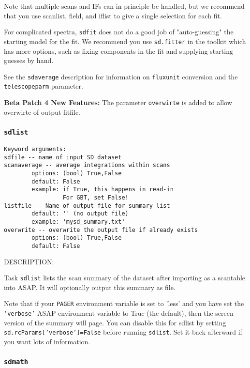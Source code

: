     Note that multiple scans and IFs can in principle be handled, but
    we recommend that you use scanlist, field, and iflist to give a
    single selection for each fit.

    For complicated spectra, {\tt sdfit} does not do a good job of
    "auto-guessing" the starting model for the fit.  We recommend
    you use {\tt sd.fitter} in the toolkit which has more options, such
    as fixing components in the fit and supplying starting guesses
    by hand.

    See the {\tt sdaverage} description for information on {\tt fluxunit} 
    conversion and the {\tt telescopeparm} parameter.

    {\bf Beta Patch 4 New Features:}
    The parameter {\tt overwirte} is added to allow overwirte of output fitfile.

\subsubsection{{\tt sdlist}}
\label{section:sd.sdtasks.tasks.sdlist}

\begin{verbatim}
Keyword arguments:
sdfile -- name of input SD dataset
scanaverage -- average integrations within scans
        options: (bool) True,False
        default: False
        example: if True, this happens in read-in
                 For GBT, set False!
listfile -- Name of output file for summary list
        default: '' (no output file)
        example: 'mysd_summary.txt'
overwrite -- overwrite the output file if already exists
        options: (bool) True,False
        default: False
\end{verbatim}
    
    DESCRIPTION:
    
    Task {\tt sdlist} lists the scan summary of the dataset after importing
    as a scantable into ASAP.  It will optionally output this summary
    as file.
    
    Note that if your {\tt PAGER} environment variable is set to 'less' and
    you have set the {\tt 'verbose'} ASAP environment variable to True
    (the default), then the screen version of the summary will page.
    You can disable this for sdlist by setting
         {\tt sd.rcParams['verbose']=False}
    before running {\tt sdlist}.  Set it back afterward if you want lots
    of information.

\subsubsection{{\tt sdmath}}
\label{section:sd.sdtasks.tasks.sdmath}

